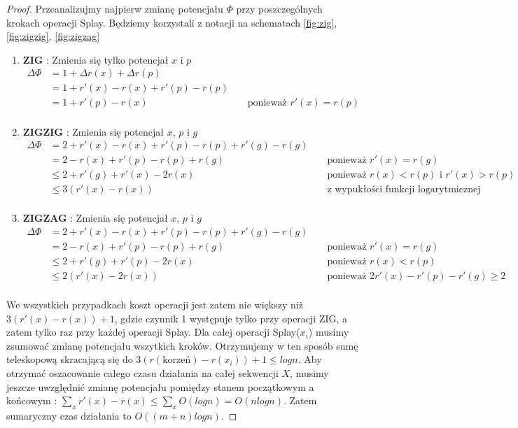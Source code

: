 \documentclass[declaration,shortabstract]{iithesis}
\theoremstyle{thm}
\theoremstyle{remark}
\theoremstyle{plain}
\theoremstyle{plain}
\theoremstyle{plain}
\begin{document}
\begin{proof}
Przeanalizujmy najpierw zmianę potencjału \(\Phi\) przy poszczególnych krokach operacji Splay. Będziemy korzystali z notacji na schematach \ref{fig:zig}, \ref{fig:zigzig}, \ref{fig:zigzag} \\ 
\begin{enumerate} 
\item{\textbf{ZIG} : Zmienia się tylko potencjał $x$ i $p$
\begin{align*} 
\Delta \Phi & = 1 + \Delta r(x) + \Delta r(p) \\
 & = 1 + r'(x) - r(x) + r'(p) - r(p) \\ 
 & = 1 + r'(p) - r(x) && \text{ ponieważ }r'(x) = r(p)\\ 
 \end{align*}} 
\item{\textbf{ZIGZIG} : Zmienia się potencjał $x$, $p$ i $g$ 
\begin{align*} 
\Delta \Phi & = 2 + r'(x) - r(x) + r'(p) - r(p) + r'(g) - r(g)\\ 
& =2 - r(x) + r'(p) - r(p) + r(g)   && \text{ ponieważ } r'(x) = r(g)\\ 
& \leq 2 + r'(g) + r'(x) - 2r(x) && \text{ ponieważ } r(x) < r(p) \text{ i } r'(x) > r(p)\\ 
& \leq 3(r'(x) - r(x)) && \text{ z wypukłości funkcji logarytmicznej}\\ 
\end{align*}} 
\item{\textbf{ZIGZAG} : Zmienia się potencjał $x$, $p$ i $g$ 
\begin{align*} 
\Delta \Phi & =  2 + r'(x) - r(x) + r'(p) - r(p) + r'(g) - r(g)\\ 
& = 2 - r(x) + r'(p) - r(p) + r(g)   && \text{ ponieważ } r'(x) = r(g)\\ 
& \leq 2 + r'(g) + r'(p) - 2r(x) && \text{ ponieważ }r(x) < r(p)\\ 
& \leq 2(r'(x) -2r(x)) && \text{ ponieważ } 2r'(x) - r'(p) - r'(g) \geq 2\\ 
\end{align*}} 
\end{enumerate} 
We wszystkich przypadkach koszt operacji jest zatem nie większy niż \( 3(r'(x) - r(x)) + 1\), gdzie czynnik 1 występuje tylko przy operacji ZIG, a zatem tylko raz przy każdej operacji Splay. Dla całej operacji Splay(\(x_i\)) musimy zsumować zmianę potencjału wszytkich kroków. Otrzymujemy w ten sposób sumę teleskopową skracającą się do \(3(r(\text{korzeń}) - r(x_i)) + 1 \leq logn\). Aby otrzymać oszacowanie całego czasu działania na całej sekwencji $X$, musimy jeszcze uwzględnić zmianę potencjału pomiędzy stanem początkowym a końcowym : \( \sum_x r'(x) - r(x) \leq \sum_x O(logn) = O(nlogn)\). Zatem sumaryczny czas działania to \( O((m+n)logn)\).  

\end{proof}  
\end{document}
